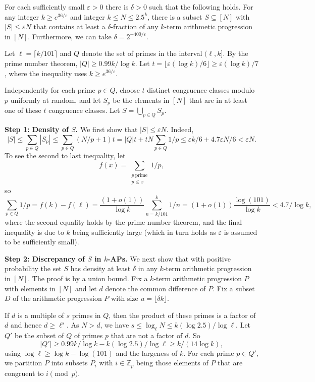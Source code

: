 \documentclass[10pt,a4paper]{amsart}
\makeatletter
\renewenvironment{proof}[1][\proofname]{\par
  \vspace{-\topsep}%
  \pushQED{\qed}%
  \normalfont
  \topsep0pt \partopsep0pt %
  \trivlist
  \item[\hskip\labelsep
        \itshape
    #1\@addpunct{.}]\ignorespaces
}{%
  \popQED\endtrivlist\@endpefalse
  \addvspace{6pt plus 6pt} %
}
\makeatother
\begin{document}
\begin{lem}\label{intervaldense}
For each sufficiently small $\varepsilon>0$ there is $\delta>0$ such that the following holds. For any integer $k \geq e^{36/\varepsilon}$ and integer $k \leq N \leq 2.5^k$, there is a subset $S \subseteq [N]$ with $|S| \leq \varepsilon N$ that contains at least a $\delta$-fraction of any $k$-term arithmetic progression in $[N]$. Furthermore, we can take $\delta =2^{-400/\varepsilon}$. 
\end{lem}

\begin{proof}
Let $\ell=\lceil k/101 \rceil$ and $Q$ denote the set of primes in the interval $(\ell,k]$. By the prime number theorem, $|Q| \geq 0.99k/\log k$. Let $t=\lfloor \varepsilon (\log k)/6\rfloor \geq \varepsilon (\log k)/7$, where the inequality uses $k \geq e^{36/\varepsilon}$. 

Independently for each prime $p \in Q$, choose $t$ distinct congruence classes modulo $p$ uniformly at random, and let $S_p$ be the elements in $[N]$ that are in at least one of these $t$ congruence classes. Let $S=\bigcup_{p \in Q} S_p$. 

{\bf Step 1: Density of $S$.} We first show that $|S| \leq \varepsilon N$. Indeed, $$|S|\le \sum_{p\in Q} |S_p|\le \sum_{p\in Q} (N/p+1)t = |Q|t+tN \sum_{p\in Q}1/p\le \varepsilon k /6+4.7\varepsilon N/6 < \varepsilon N.$$
To see the second to last inequality, let $$f(x)=\sum_{\substack{p~\textrm{prime} \\ p \leq x}} 1/p,$$ so $$\sum_{p \in Q} 1/p=f(k)-f(\ell)=\frac{(1+o(1))}{\log k}\sum_{n=k/101}^k 1/n = (1+o(1))\frac{\log(101)}{\log k}<4.7/\log k,$$ where the second equality holds by the prime number theorem, and the final inequality is due to $k$ being sufficiently large (which in turn holds as $\varepsilon$ is assumed to be sufficiently small).



{\bf Step 2: Discrepancy of $S$ in $k$-APs.} We next show that with positive probability the set $S$ has density at least $\delta$ in any $k$-term arithmetic progression in $[N]$. The proof is by a union bound. Fix a $k$-term arithmetic progression $P$ with elements in $[N]$ and let $d$ denote the common difference of $P$. Fix a subset $D$ of the arithmetic progression $P$ with size $u=\lfloor \delta k \rfloor$. 

If $d$ is a multiple of $s$ primes in $Q$, then the product of these primes is a factor of $d$ and hence $d \geq \ell^s$. As $N > d$, we have $s \leq \log_{\ell} N \leq k(\log 2.5)/\log \ell$. Let $Q'$ be the subset of $Q$ of primes $p$ that are not a factor of $d$. So $$|Q'| \geq 0.99k/\log k - k(\log 2.5)/\log \ell \geq k/(14\log k),$$using $\log\ell\ge\log k-\log(101)$ and the largeness of $k$. For each prime $p \in Q'$, we partition $P$ into subsets $P_i$ with $i \in \mathbb{Z}_p$ being those elements of $P$ that are congruent to $i \pmod p$. 


\end{proof}
\end{document}
